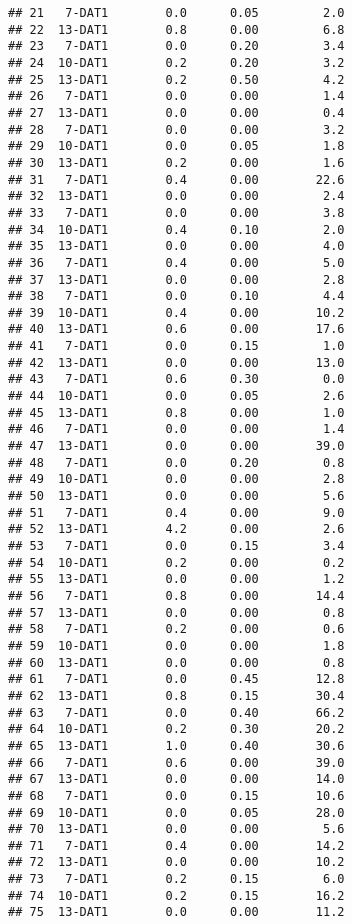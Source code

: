 \documentclass[
]{article}
\begin{document}
\begin{verbatim}
## 21   7-DAT1        0.0      0.05         2.0
## 22  13-DAT1        0.8      0.00         6.8
## 23   7-DAT1        0.0      0.20         3.4
## 24  10-DAT1        0.2      0.20         3.2
## 25  13-DAT1        0.2      0.50         4.2
## 26   7-DAT1        0.0      0.00         1.4
## 27  13-DAT1        0.0      0.00         0.4
## 28   7-DAT1        0.0      0.00         3.2
## 29  10-DAT1        0.0      0.05         1.8
## 30  13-DAT1        0.2      0.00         1.6
## 31   7-DAT1        0.4      0.00        22.6
## 32  13-DAT1        0.0      0.00         2.4
## 33   7-DAT1        0.0      0.00         3.8
## 34  10-DAT1        0.4      0.10         2.0
## 35  13-DAT1        0.0      0.00         4.0
## 36   7-DAT1        0.4      0.00         5.0
## 37  13-DAT1        0.0      0.00         2.8
## 38   7-DAT1        0.0      0.10         4.4
## 39  10-DAT1        0.4      0.00        10.2
## 40  13-DAT1        0.6      0.00        17.6
## 41   7-DAT1        0.0      0.15         1.0
## 42  13-DAT1        0.0      0.00        13.0
## 43   7-DAT1        0.6      0.30         0.0
## 44  10-DAT1        0.0      0.05         2.6
## 45  13-DAT1        0.8      0.00         1.0
## 46   7-DAT1        0.0      0.00         1.4
## 47  13-DAT1        0.0      0.00        39.0
## 48   7-DAT1        0.0      0.20         0.8
## 49  10-DAT1        0.0      0.00         2.8
## 50  13-DAT1        0.0      0.00         5.6
## 51   7-DAT1        0.4      0.00         9.0
## 52  13-DAT1        4.2      0.00         2.6
## 53   7-DAT1        0.0      0.15         3.4
## 54  10-DAT1        0.2      0.00         0.2
## 55  13-DAT1        0.0      0.00         1.2
## 56   7-DAT1        0.8      0.00        14.4
## 57  13-DAT1        0.0      0.00         0.8
## 58   7-DAT1        0.2      0.00         0.6
## 59  10-DAT1        0.0      0.00         1.8
## 60  13-DAT1        0.0      0.00         0.8
## 61   7-DAT1        0.0      0.45        12.8
## 62  13-DAT1        0.8      0.15        30.4
## 63   7-DAT1        0.0      0.40        66.2
## 64  10-DAT1        0.2      0.30        20.2
## 65  13-DAT1        1.0      0.40        30.6
## 66   7-DAT1        0.6      0.00        39.0
## 67  13-DAT1        0.0      0.00        14.0
## 68   7-DAT1        0.0      0.15        10.6
## 69  10-DAT1        0.0      0.05        28.0
## 70  13-DAT1        0.0      0.00         5.6
## 71   7-DAT1        0.4      0.00        14.2
## 72  13-DAT1        0.0      0.00        10.2
## 73   7-DAT1        0.2      0.15         6.0
## 74  10-DAT1        0.2      0.15        16.2
## 75  13-DAT1        0.0      0.00        11.2

\end{verbatim}
\end{document}
